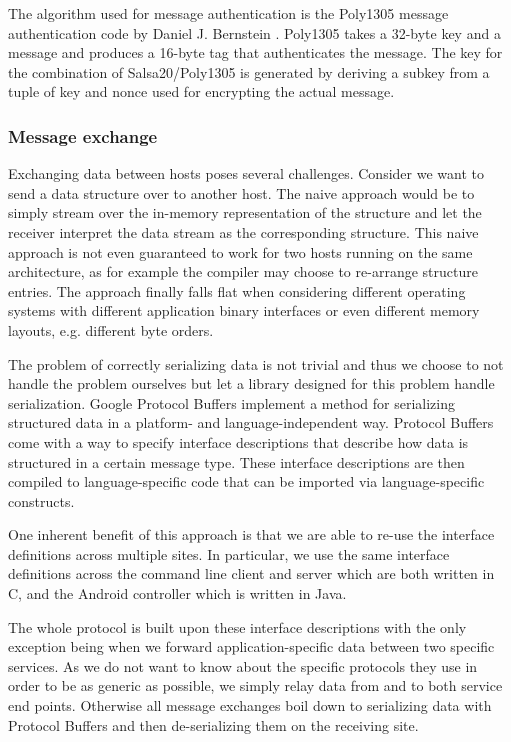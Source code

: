 The algorithm used for message authentication is the Poly1305 message authentication code by Daniel J. Bernstein \cite{bernstein2005poly1305}.
Poly1305 takes a 32-byte key and a message and produces a 16-byte tag that authenticates the message.
The key for the combination of Salsa20/Poly1305 is generated by deriving a subkey from a tuple of key and nonce used for encrypting the actual message.

\subsubsection{Message exchange}

Exchanging data between hosts poses several challenges.
Consider we want to send a data structure over to another host.
The naive approach would be to simply stream over the in-memory representation of the structure and let the receiver interpret the data stream as the corresponding structure.
This naive approach is not even guaranteed to work for two hosts running on the same architecture, as for example the compiler may choose to re-arrange structure entries.
The approach finally falls flat when considering different operating systems with different application binary interfaces or even different memory layouts, e.g. different byte orders.

The problem of correctly serializing data is not trivial and thus we choose to not handle the problem ourselves but let a library designed for this problem handle serialization.
Google Protocol Buffers \cite{varda2008protocol} implement a method for serializing structured data in a platform- and language-independent way.
Protocol Buffers come with a way to specify interface descriptions that describe how data is structured in a certain message type.
These interface descriptions are then compiled to language-specific code that can be imported via language-specific constructs.

One inherent benefit of this approach is that we are able to re-use the interface definitions across multiple sites.
In particular, we use the same interface definitions across the command line client and server which are both written in C, and the Android controller which is written in Java.

The whole protocol is built upon these interface descriptions with the only exception being when we forward application-specific data between two specific services.
As we do not want to know about the specific protocols they use in order to be as generic as possible, we simply relay data from and to both service end points.
Otherwise all message exchanges boil down to serializing data with Protocol Buffers and then de-serializing them on the receiving site.

